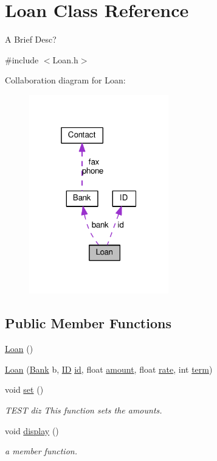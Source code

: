 \hypertarget{classLoan}{\section{Loan Class Reference}
\label{classLoan}
}


A Brief Desc?  




{\ttfamily \#include $<$Loan.\+h$>$}



Collaboration diagram for Loan\+:\nopagebreak
\begin{figure}[H]
\begin{center}
\leavevmode
\includegraphics[width=172pt]{classLoan__coll__graph}
\end{center}
\end{figure}
\subsection*{Public Member Functions}
\begin{DoxyCompactItemize}
\item 
\hyperlink{classLoan_ac9837063879d5a4d21f288bdd5db6013}{Loan} ()
\item 
\hyperlink{classLoan_aefae6841fb1990b946ca473ff6a1ef8c}{Loan} (\hyperlink{classBank}{Bank} b, \hyperlink{classID}{I\+D} \hyperlink{classLoan_a77036ebdfea09fa00f2e6c5e1c7ee3c5}{id}, float \hyperlink{classLoan_a1cdd7876daa9a78ab7ac76cfdd17429e}{amount}, float \hyperlink{classLoan_a9b41857ab5a2bcc22bb877c14565071b}{rate}, int \hyperlink{classLoan_a9a132d11ff7a8126a1d7b556d03a4ea9}{term})
\item 
void \hyperlink{classLoan_a0536fb4faa0670d69afa6adf97ef161c}{set} ()
\begin{DoxyCompactList}\small\item\em T\+E\+S\+T diz This function sets the amounts. \end{DoxyCompactList}\item 
void \hyperlink{classLoan_a271b5df7e102eb82cb43c76029301fae}{display} ()
\begin{DoxyCompactList}\small\item\em a member function. \end{DoxyCompactList}\end{DoxyCompactItemize}
